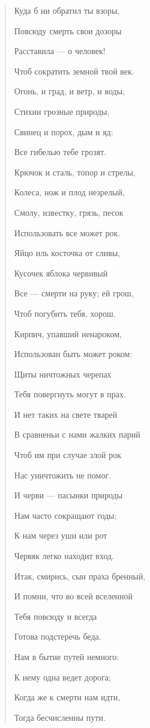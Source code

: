 \documentclass[12pt]{article}
\begin{document}
\begin{quote}

Куда б ни обратил ты взоры, 

Повсюду смерть свои дозоры 

Расставила --- о человек! 

Чтоб сократить земной твой век. 

Огонь, и град, и ветр, и воды, 

Стихии грозные природы, 

Свинец и порох, дым и яд: 

Все гибелью тебе грозят. 

Крючок и сталь, топор и стрелы, 

Колеса, нож и плод незрелый, 

Смолу, известку, грязь, песок 

Использовать все может рок. 

Яйцо иль косточка от сливы, 

Кусочек яблока червивый 

Все --- смерти на руку; ей грош, 

Чтоб погубить тебя, хорош. 

Кирпич, упавший ненароком, 

Использован быть может роком: 

Щиты ничтожных черепах 

Тебя повергнуть могут в прах. 

И нет таких на свете тварей 

В сравненьи с нами жалких парий 

Чтоб им при случае злой рок 

Нас уничтожить не помог. 

И черви --- пасынки природы 

Нам часто сокращают годы; 

К нам через уши или рот 

Червяк легко находит вход. 

Итак, смирись, сын праха бренный, 

И помни, что во всей вселенной 

Тебя повсюду и всегда 

Готова подстеречь беда. 

Нам в бытие путей немного: 

К нему одна ведет дорога; 

Когда же к смерти нам идти, 

Тогда бесчисленны пути. 

\end{quote}
\end{document}
